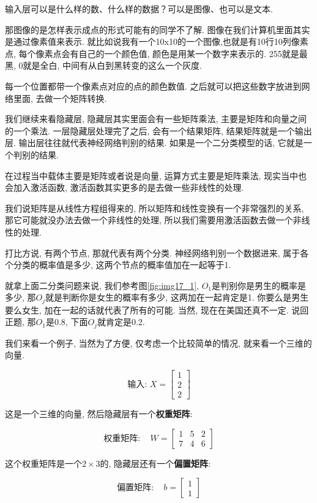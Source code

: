输入层可以是什么样的数、什么样的数据？可以是图像、也可以是文本. 

那图像的是怎样表示成点的形式可能有的同学不了解. 图像在我们计算机里面其实是通过像素值来表示. 就比如说我有一个10x10的一个图像,也就是有10行10列像素点, 每个像素点会有自己的一个颜色值, 颜色是用某一个数字来表示的. 255就是最黑, 0就是全白, 中间有从白到黑转变的这么一个灰度. 

每一个位置都带一个像素点对应的点的颜色数值. 之后就可以把这些数字放进到网络里面, 去做一个矩阵转换. 

我们继续来看隐藏层, 隐藏层其实里面会有一些矩阵乘法, 主要是矩阵和向量之间的一个乘法. 一层隐藏层处理完了之后, 会有一个结果矩阵, 结果矩阵就是一个输出层. 输出层往往就代表神经网络判别的结果. 如果是一个二分类模型的话, 它就是一个判别的结果. 

在过程当中载体主要是矩阵或者说是向量, 运算方式主要是矩阵乘法, 现实当中也会加入激活函数, 激活函数其实更多的是去做一些非线性的处理. 

我们说矩阵是从线性方程组得来的, 所以矩阵和线性变换有一个非常强烈的关系, 那它可能就没办法去做一个非线性的处理, 所以我们需要用激活函数去做一个非线性的处理. 

打比方说, 有两个节点, 那就代表有两个分类. 神经网络判别一个数据进来, 属于各个分类的概率值是多少, 这两个节点的概率值加在一起等于1. 

就拿上面二分类问题来说, 我们参考图\ref{fig:img17_1}, $O_1$是判别你是男生的概率是多少, 那$O_j$就是判断你是女生的概率有多少, 这两加在一起肯定是1. 你要么是男生要么女生, 加在一起的话就代表了所有的可能. 当然, 现在在美国还真不一定. 说回正题, 那$O_1$是0.8, 下面$O_j$就肯定是0.2. 

我们来看一个例子, 当然为了方便, 仅考虑一个比较简单的情况, 就来看一个三维的向量. 

\[
  \mbox{输入: } X = \begin{bmatrix} 1 \\ 2 \\ 2 \end{bmatrix}
\]

这是一个三维的向量, 然后隐藏层有一个\textbf{权重矩阵}: 

\[
  \mbox{权重矩阵}: \quad W = \begin{bmatrix} 1 & 5 & 2 \\ 7 & 4 & 6 \end{bmatrix}
\]

这个权重矩阵是一个$2 \times 3$的, 隐藏层还有一个\textbf{偏置矩阵}: 

\[
  \mbox{偏置矩阵}: \quad b = \begin{bmatrix} 1 \\ 1 \end{bmatrix}
\]

